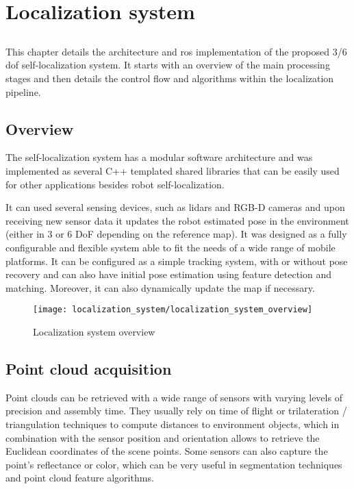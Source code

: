 \chapter{Localization system} \label{chap:localization-system}



\section*{}

This chapter details the architecture and \gls{ros} implementation of the proposed 3/6 \gls{dof} self-localization system. It starts with an overview of the main processing stages and then details the control flow and algorithms within the localization pipeline.



\section{Overview}

The self-localization system has a modular software architecture and was implemented as several C++ templated shared libraries that can be easily used for other applications besides robot self-localization.

It can used several sensing devices, such as \glspl{lidar} and RGB-D cameras and upon receiving new sensor data it updates the robot estimated pose in the environment (either in 3 or 6 DoF depending on the reference map). It was designed as a fully configurable and flexible system able to fit the needs of a wide range of mobile platforms. It can be configured as a simple tracking system, with or without pose recovery and can also have initial pose estimation using feature detection and matching. Moreover, it can also dynamically update the map if necessary.


\begin{figure}[H]
	\centering
	\texttt{[image: localization\_system/localization\_system\_overview]}
	\caption{Localization system overview}
	\label{fig:localization-system_localization-system-overview}
\end{figure}



\section{Point cloud acquisition}

Point clouds can be retrieved with a wide range of sensors with varying levels of precision and assembly time. They usually rely on time of flight or trilateration / triangulation techniques to compute distances to environment objects, which in combination with the sensor position and orientation allows to retrieve the Euclidean coordinates of the scene points. Some sensors can also capture the point's reflectance or color, which can be very useful in segmentation techniques and point cloud feature algorithms.



